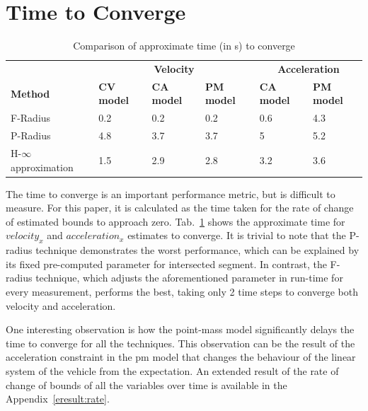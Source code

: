 \section{Time to Converge}
\begin{table}[!h]
\caption{Comparison of approximate time (in s) to converge}
	\centering
	\renewcommand{\arraystretch}{1.1}
	\small	
	\begin{tabular}{l l l l l l}
		\toprule 
		
		& \multicolumn{3}{c}{\textbf{Velocity}} & \multicolumn{2}{c}{\textbf{Acceleration}}\\ \cmidrule(l){2-4} \cmidrule(l){5-6}
		\textbf{Method} & \textbf{CV model} & \textbf{CA model} & \textbf{PM model} & \textbf{CA model} & \textbf{PM model}\\ \midrule
		F-Radius & 0.2 & 0.2 & 0.2 & 0.6 & 4.3\\
		P-Radius & 4.8 & 3.7 & 3.7 & 5 & 5.2 \\
		H-$\infty$ approximation & 1.5 & 2.9 & 2.8 & 3.2 & 3.6\\
		\bottomrule
	\end{tabular}
	\label{tab:convtime}
\end{table}
The time to converge is an important performance metric, but is difficult to measure. For this paper, it is calculated as the time taken for the rate of change of estimated bounds to approach zero. Tab.~\ref{tab:convtime} shows the approximate time for $velocity_x$ and $acceleration_x$ estimates to converge. It is trivial to note that the P-radius technique demonstrates the worst performance, which can be explained by its fixed pre-computed parameter for intersected segment. In contrast, the F-radius technique, which adjusts the aforementioned parameter in run-time for every measurement, performs the best, taking only 2 time steps to converge both velocity and acceleration.

One interesting observation is how the point-mass model significantly delays the time to converge for all the techniques. This observation can be the result of the acceleration constraint in the pm model that changes the behaviour of the linear system of the vehicle from the expectation. An extended result of the rate of change of bounds of all the variables over time is available in the Appendix~\ref{eresult:rate}. 

